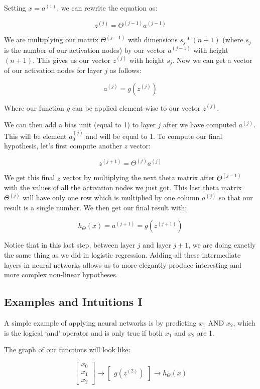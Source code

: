 \documentclass[UTF8]{article}
\begin{document}
Setting $x=a^{(1)}$, we can rewrite the equation as:

\[z^{(j)} = \Theta^{(j-1)}a^{(j-1)}\]

We are multiplying our matrix $\Theta^{(j-1)}$ with dimensions $s_j*(n+1)$ (where $s_j$ is the number of our activation nodes) by our vector $a^{(j-1)}$ with height $(n+1)$. This gives us our vector $z^{(j)}$ with height $s_j$. Now we can get a vector of our activation nodes for layer $j$ as follows:

\[a^{(j)} = g(z^{(j)})\]

Where our function $g$ can be applied element-wise to our vector $z^{(j)}$.

We can then add a bias unit (equal to 1) to layer $j$ after we have computed $a^{(j)}$. This will be element $a^{(j)}_0$ and will be equal to 1. To compute our final hypothesis, let's first compute another $z$ vector:

\[z^{(j+1)} = \Theta^{(j)}a^{(j)}\]

We get this final $z$ vector by multiplying the next theta matrix after $\Theta^{(j-1)}$ with the values of all the activation nodes we just got. This last theta matrix $\Theta^{(j)}$ will have only one row which is multiplied by one column $a^{(j)}$ so that our result is a single number. We then get our final result with:

\[h_\Theta(x) = a^{(j+1)} = g(z^{(j+1)})\]

Notice that in this last step, between layer $j$ and layer $j+1$, we are doing exactly the same thing as we did in logistic regression. Adding all these intermediate layers in neural networks allows us to more elegantly produce interesting and more complex non-linear hypotheses.

\subsection{Examples and Intuitions I}

A simple example of applying neural networks is by predicting $x_1$ AND $x_2$, which is the logical `and' operator and is only true if both $x_1$ and $x_2$ are 1.

The graph of our functions will look like:

\[\begin{bmatrix}x_0 \\ x_1 \\ x_2\end{bmatrix} \rightarrow\begin{bmatrix}g(z^{(2)})\end{bmatrix} \rightarrow h_\Theta(x)\]
\end{document}
